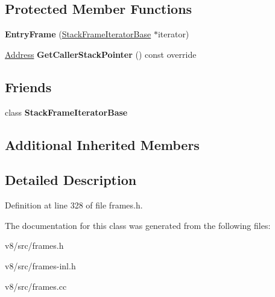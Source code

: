 \subsection*{Protected Member Functions}
\begin{DoxyCompactItemize}
\item 
\mbox{\label{classv8_1_1internal_1_1EntryFrame_a785f12a4457418661ccaa5f616aac5c9}} 
{\bfseries Entry\+Frame} (\mbox{\hyperlink{classv8_1_1internal_1_1StackFrameIteratorBase}{Stack\+Frame\+Iterator\+Base}} $\ast$iterator)
\item 
\mbox{\label{classv8_1_1internal_1_1EntryFrame_a79bc59ebd2aa35d19f97d8307c050baf}} 
\mbox{\hyperlink{classuintptr__t}{Address}} {\bfseries Get\+Caller\+Stack\+Pointer} () const override
\end{DoxyCompactItemize}
\subsection*{Friends}
\begin{DoxyCompactItemize}
\item 
\mbox{\label{classv8_1_1internal_1_1EntryFrame_ac7310421866976ca454bbe11c5f926c3}} 
class {\bfseries Stack\+Frame\+Iterator\+Base}
\end{DoxyCompactItemize}
\subsection*{Additional Inherited Members}


\subsection{Detailed Description}


Definition at line 328 of file frames.\+h.



The documentation for this class was generated from the following files\+:\begin{DoxyCompactItemize}
\item 
v8/src/frames.\+h\item 
v8/src/frames-\/inl.\+h\item 
v8/src/frames.\+cc\end{DoxyCompactItemize}

